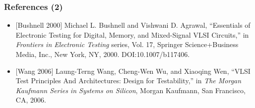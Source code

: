 \documentclass[xcolor={usenames,dvipsnames},hyperref={hyperindex,bookmarks}]{beamer}
\begin{document}
\frame
{
	\frametitle{References (2)}

	\begin{itemize}
	\item $[$Bushnell 2000$]$ Michael L. Bushnell and Vishwani D. Agrawal, ``Essentials of Electronic Testing for Digital, Memory, and Mixed-Signal {VLSI} Circuits,'' in {\it Frontiers in Electronic Testing} series, Vol. 17, Springer Science+Business Media, {Inc.}, New York, NY, 2000. DOI:10.1007/b117406.
	\item $[$Wang 2006$]$ {Laung-Terng} Wang, {Cheng-Wen} Wu, and Xiaoqing Wen, ``{VLSI} Test Principles And Architectures: Design for Testability,'' in {\it The Morgan Kaufmann Series in Systems on Silicon}, Morgan Kaufmann, San Francisco, CA, 2006.
	\end{itemize}
}
\end{document}
